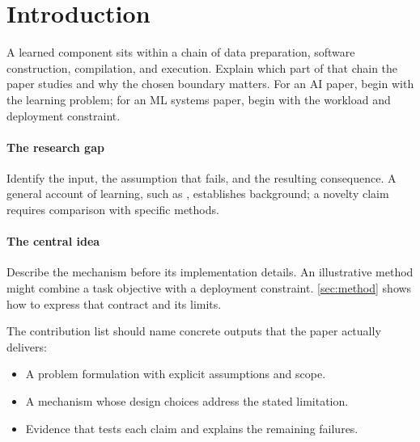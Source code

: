 \section{Introduction}
\label{sec:introduction}
A learned component sits within a chain of data preparation, software
construction, compilation, and execution. Explain which part of that chain
the paper studies and why the chosen boundary matters. For an AI paper,
begin with the learning problem; for an ML systems paper, begin with the
workload and deployment constraint.

\paragraph{The research gap}
Identify the input, the assumption that fails, and the resulting consequence.
A general account of learning, such as \citet{goodfellow2016}, establishes
background; a novelty claim requires comparison with specific methods.

\paragraph{The central idea}
Describe the mechanism before its implementation details. An illustrative
method might combine a task objective with a deployment constraint.
\autoref{sec:method} shows how to express that contract and its limits.

The contribution list should name concrete outputs that the paper actually
delivers:
\begin{itemize}
  \item A problem formulation with explicit assumptions and scope.
  \item A mechanism whose design choices address the stated limitation.
  \item Evidence that tests each claim and explains the remaining failures.
\end{itemize}


